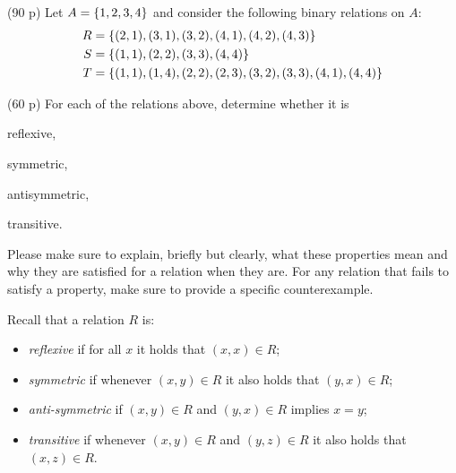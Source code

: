 \documentclass{jn-pset}
\begin{document}
\begin{problem}%
  \label{problem:relations}%
  (90 p)  
  Let
  $A = \{ 1, 2, 3, 4 \}$
  and consider the following binary relations on $A$:
  \begin{align*}
    R &= \{  (2,1), (3,1), (3,2), (4,1), (4,2), (4,3)  \} \\
    S &= \{  (1,1), (2,2), (3,3), (4,4)  \} \\
    T &= \{  (1,1), (1, 4), (2,2), (2,3), (3,2), (3,3), (4,1), (4,4)  \}
  \end{align*}

  \begin{subproblem}
    {(60 p)}
    {\ignorespaces}
    For each of the relations above, determine whether it is
    \begin{compactenum}
    \item
      reflexive,      
    \item
      symmetric,
    \item
      antisymmetric,
    \item
      transitive.
    \end{compactenum}
    Please make sure to explain, briefly but clearly, what these properties
    mean and why they are satisfied for a relation when
    they are. For any relation that
    fails to satisfy a property, make sure to provide a specific
    counterexample.

  \end{subproblem}

  \begin{solution}
    Recall that a relation $R$ is:
    \begin{itemize}
    \item
      \emph{reflexive} if for all $x$ it holds that $(x,x) \in R$;
      
    \item
      \emph{symmetric} if whenever
      $(x,y) \in R$
      it also holds that
      $(y,x) \in R$;

    \item
      \emph{anti-symmetric} if 
      $(x,y) \in R$
      and
      $(y,x) \in R$ implies
      $x=y$;
      
    \item
      \emph{transitive} if whenever
      $(x,y) \in R$
      and
      $(y,z) \in R$
      it also holds that
      $(x,z) \in R$.      
    \end{itemize}


\end{solution}
\end{problem}
\end{document}
